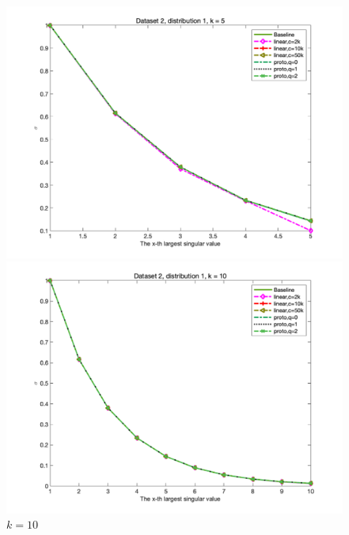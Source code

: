 \documentclass{article}
\begin{document}
\begin{figure}[p]
	\begin{minipage}{0.54\linewidth}
		\centering
		\includegraphics[width=1\linewidth]{./fig/dataset2_k5_t1.png}
		\caption{$k=5$}
	\end{minipage}
	\begin{minipage}{0.54\linewidth}
		\centering
		\includegraphics[width=1\linewidth]{./fig/dataset2_k10_t1.png}
		\caption{$k=10$}
	\end{minipage}
    \begin{minipage}{0.54\linewidth}
		\centering

\end{minipage}
\end{figure}
\end{document}
